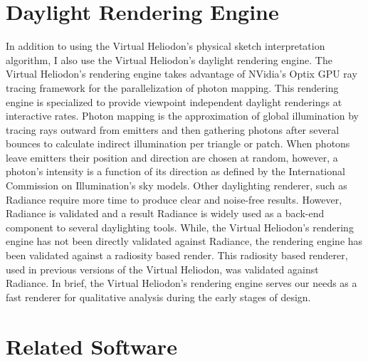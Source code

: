 \section{Daylight Rendering Engine}
	In addition to using the Virtual Heliodon's physical sketch interpretation algorithm, I also use the Virtual Heliodon's daylight rendering engine\cite{li2011photon,nasman2013physical}. 
	The Virtual Heliodon's rendering engine takes advantage of NVidia's Optix GPU ray tracing framework for the parallelization of photon mapping\cite{parker2010optix}.
	This rendering engine is specialized to provide viewpoint independent daylight renderings at interactive rates.
	Photon mapping is the approximation of global illumination by tracing rays outward from emitters and then gathering photons after several bounces to calculate indirect illumination per triangle or patch\cite{hachisuka2008progressive}.
	When photons leave emitters their position and direction are chosen at random, however, a photon's intensity is a function of its direction as defined by the International Commission on Illumination's sky models\cite{de1994spatial}. 
	Other daylighting renderer, such as Radiance require more time to produce clear and noise-free results\cite{compagnon1997radiance}. 
	However, Radiance is validated and a result Radiance is widely used as a back-end component to several daylighting tools\cite{reinhart2006development, Galasiu}.
	While, the Virtual Heliodon's rendering engine has not been directly validated against Radiance, the rendering engine has been validated against a radiosity based render.
	This radiosity based renderer, used in previous versions of the Virtual Heliodon, was validated against Radiance\cite{sheng2010global}. 
	In brief, the Virtual Heliodon's rendering engine serves our needs as a fast renderer for qualitative analysis during the early stages of design.

\section{Related Software}

